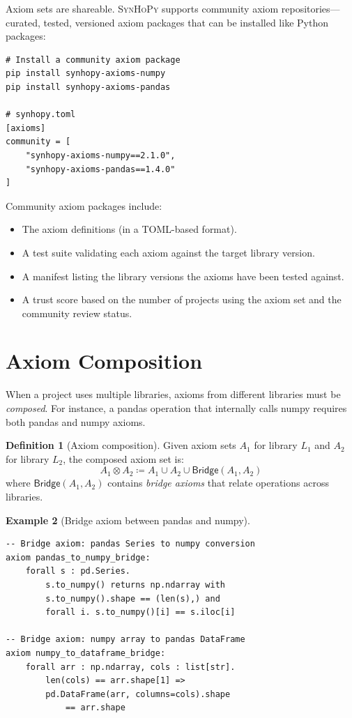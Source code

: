 \documentclass[11pt,a4paper]{report}
\theoremstyle{definition}
\newtheorem{definition}{Definition}[chapter]
\newtheorem{example}[definition]{Example}
\theoremstyle{plain}
\newcommand{\defeq}{\coloneqq}
\newcommand{\synhopy}{\textsc{SynHoPy}}
\begin{document}
Axiom sets are shareable.  \synhopy{} supports community axiom
repositories---curated, tested, versioned axiom packages that can be
installed like Python packages:

\begin{lstlisting}[style=python]
# Install a community axiom package
pip install synhopy-axioms-numpy
pip install synhopy-axioms-pandas

# synhopy.toml
[axioms]
community = [
    "synhopy-axioms-numpy==2.1.0",
    "synhopy-axioms-pandas==1.4.0"
]
\end{lstlisting}

Community axiom packages include:
\begin{itemize}
  \item The axiom definitions (in a TOML-based format).
  \item A test suite validating each axiom against the target library version.
  \item A manifest listing the library versions the axioms have been tested
    against.
  \item A trust score based on the number of projects using the axiom set
    and the community review status.
\end{itemize}

\section{Axiom Composition}

When a project uses multiple libraries, axioms from different libraries must
be \emph{composed}.  For instance, a pandas operation that internally calls
numpy requires both pandas and numpy axioms.

\begin{definition}[Axiom composition]
Given axiom sets $A_1$ for library $L_1$ and $A_2$ for library $L_2$, the
composed axiom set is:
\[
  A_1 \otimes A_2 \defeq A_1 \cup A_2 \cup \mathsf{Bridge}(A_1, A_2)
\]
where $\mathsf{Bridge}(A_1, A_2)$ contains \emph{bridge axioms} that relate
operations across libraries.
\end{definition}

\begin{example}[Bridge axiom between pandas and numpy]
\begin{lstlisting}[style=proof]
-- Bridge axiom: pandas Series to numpy conversion
axiom pandas_to_numpy_bridge:
    forall s : pd.Series.
        s.to_numpy() returns np.ndarray with
        s.to_numpy().shape == (len(s),) and
        forall i. s.to_numpy()[i] == s.iloc[i]

-- Bridge axiom: numpy array to pandas DataFrame
axiom numpy_to_dataframe_bridge:
    forall arr : np.ndarray, cols : list[str].
        len(cols) == arr.shape[1] =>
        pd.DataFrame(arr, columns=cols).shape
            == arr.shape
\end{lstlisting}
\end{example}
\end{document}
